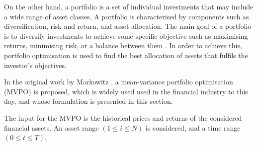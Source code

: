 \documentclass[prx,twocolumn,floatfix,superscriptaddress,longbibliography]{revtex4-1}
\begin{document}
On the other hand, a portfolio is a set of individual investments that may include a wide range of asset classes. A portfolio is characterised by components such as diversification, risk and return, and asset allocation. The main goal of a portfolio is to diversify investments to achieve some specific objective such as maximising returns, minimising risk, or a balance between them \cite{Wilmott2007}. 
In order to achieve this, portfolio optimisation is used to find the best allocation of assets that fulfils the investor's objectives.

In the original work by Markowitz \cite{Markowitz1952}, a mean-variance portfolio optimisation (MVPO) is proposed, which is widely used used in the financial industry to this day, and whose formulation is presented in this section.

The input for the MVPO is the historical prices and returns of the considered financial assets. An asset range $(1 \leq i \leq N)$ is considered, and a time range $(0 \leq t \leq T)$. 
\end{document}
